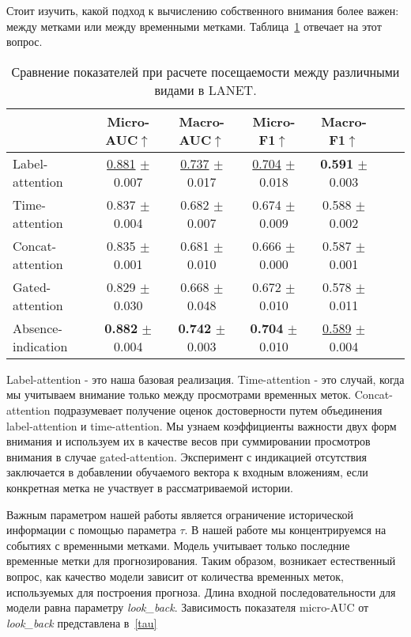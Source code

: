 \documentclass[a4paper, 12pt]{article} %
\begin{document}
Стоит изучить, какой подход к вычислению собственного внимания более важен: между метками или между временными метками.
Таблица~\ref{table:attents} отвечает на этот вопрос.
\begin{table}[ht!]
\centering
\small
\begin{tabular}{lcccccc}
\hline
 & Micro-AUC$\uparrow$ & Macro-AUC$\uparrow$ & Micro-F1$\uparrow$ & Macro-F1$\uparrow$\\ 
\hline
Label-attention & \underline{0.881} $\pm$ 0.007 & \underline{0.737} $\pm$ 0.017 & \underline{0.704} $\pm$ 0.018 & \textbf{0.591} $\pm$ 0.003\\
Time-attention & 0.837 $\pm$ 0.004 & 0.682 $\pm$ 0.007 & 0.674 $\pm$ 0.009  & 0.588 $\pm$ 0.002 \\
Concat-attention & 0.835 $\pm$ 0.001 & 0.681 $\pm$ 0.010 & 0.666 $\pm$ 0.000 & 0.587 $\pm$ 0.001 \\
Gated-attention & 0.829 $\pm$ 0.030 & 0.668 $\pm$ 0.048 & 0.672 $\pm$ 0.010 & 0.578 $\pm$ 0.011 \\
\hline
 Absence-indication & \textbf{0.882} $\pm$ 0.004 & \textbf{0.742} $\pm$ 0.003 & \textbf{0.704} $\pm$ 0.010 & \underline{0.589} $\pm$ 0.004 \\
\hline
\end{tabular}
\centering
\caption{Сравнение показателей при расчете посещаемости между различными видами в LANET. }
\label{table:attents}
\end{table}
Label-attention - это наша базовая реализация. Time-attention - это случай, когда мы учитываем внимание только между просмотрами временных меток. Concat-attention подразумевает получение оценок достоверности путем объединения label-attention и time-attention. Мы узнаем коэффициенты важности двух форм внимания и используем их в качестве весов при суммировании просмотров внимания в случае gated-attention. Эксперимент с индикацией отсутствия заключается в добавлении обучаемого вектора к входным вложениям, если конкретная метка не участвует в рассматриваемой истории.

Важным параметром нашей работы является ограничение исторической информации с помощью параметра $\tau$. В нашей работе мы концентрируемся на событиях с временными метками. Модель учитывает только последние временные метки для прогнозирования. Таким образом, возникает естественный вопрос, как качество модели зависит от количества временных меток, используемых для построения прогноза. Длина входной последовательности для модели равна параметру \textit{look\_back}. Зависимость показателя micro-AUC от \textit{look\_back} представлена в~\ref{tau}
\end{document}
